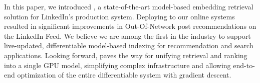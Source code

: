 
In this paper, we introduced {\systemname}, a state-of-the-art model-based embedding retrieval solution for LinkedIn's production system. Deploying {\systemname} to our online systems resulted in significant improvements in Out-Of-Network post recommendations on the LinkedIn Feed. We believe we are among the first in the industry to support live-updated, differentiable model-based indexing for recommendation and search applications. Looking forward, {\systemname} paves the way for unifying retrieval and ranking into a single GPU model, simplifying complex infrastructure and allowing end-to-end optimization of the entire differentiable system with gradient descent.